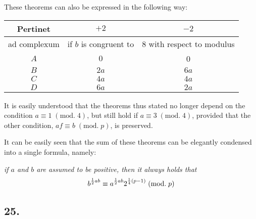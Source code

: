 \documentclass[twoside,12pt, showframe]{memoir}
\renewcommand{\pmod}[1]{\;(\textrm{mod.}\;#1)}
\let\oldfrac\frac
\def\frac#1#2{\mathchoice{\tfrac{#1}{#2}}{\oldfrac{#1}{#2}}{\genfrac{}{}{}{2}{#1}{#2\mathstrut}}{\genfrac{}{}{}{3}{#1}{#2\mathstrut}}}
\begin{document}
\begin{center}
These theorems can also be expressed in the following way:
\end{center}
\clearpage
\begin{center}
\begin{tabular}{c|c|c|}
Pertinet & \(+2\) & \(-2\) \\
\hline
ad complexum & \multicolumn{1}{r}{if \(b\) is congruent to} & \multicolumn{1}{l|}{8 with respect to modulus} \\
\hline
\(A\) & \(0\) & 0 \\
\(B\) & \(2 a\) & \(6 a\) \\
\(C\) & \(4 a\) & \(4 a\) \\
\(D\) & \(6 a\) & \(2 a\) \\
\end{tabular}
\end{center}
It is easily understood that the theorems thus stated no longer depend on the condition \(a \equiv 1\pmod{4}\), but still hold if \(a \equiv 3\pmod{4}\), provided that the other condition, \(a f \equiv b\pmod{p}\), is preserved.
%

It can be easily seen that the sum of these theorems can be elegantly condensed into a single formula, namely:
 
\textit{if \(a\) and \(b\) are assumed to be positive, then it always holds that}
\[b^{\frac{1}{2} a b} \equiv a^{\frac{1}{2} a b} 2^{\frac{1}{4}(p-1)}\pmod{p}\]
%

\subsection*{25.}
\end{document}
